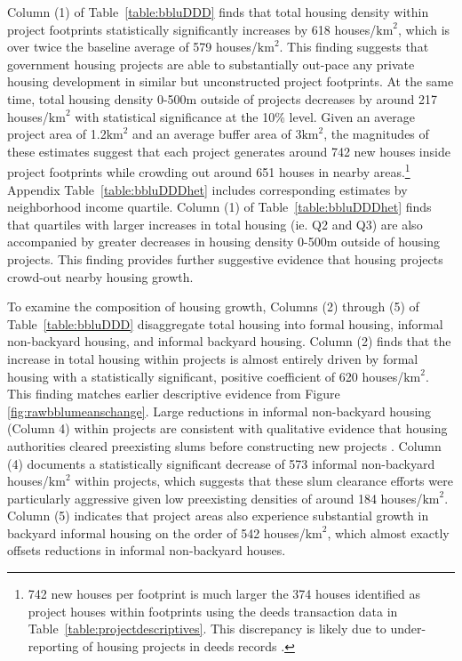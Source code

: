 \documentclass[12pt]{article}
\begin{document}
Column (1) of Table~\ref{table:bbluDDD} finds that total housing density within project footprints statistically significantly increases by 618 houses/$\text{km}^{2}$, which is over twice the baseline average of 579 houses/$\text{km}^{2}$.  This finding suggests that government housing projects are able to substantially out-pace any private housing development in similar but unconstructed project footprints.  At the same time, total housing density 0-500m outside of projects decreases by around 217 houses/$\text{km}^{2}$ with statistical significance at the 10\% level.  Given an average project area of 1.2$\text{km}^{2}$ and an average buffer area of 3$\text{km}^{2}$, the magnitudes of these estimates suggest that each project generates around 742 new houses inside project footprints while crowding out around 651 houses in nearby areas.\footnote{742 new houses per footprint is much larger the 374 houses identified as project houses within footprints using the deeds transaction data in Table~\ref{table:projectdescriptives}.  This discrepancy is likely due to under-reporting of housing projects in deeds records \citep{seriq}.}  Appendix Table~\ref{table:bbluDDDhet} includes corresponding estimates by neighborhood income quartile.  Column (1) of Table~\ref{table:bbluDDDhet} finds that quartiles with larger increases in total housing (ie. Q2 and Q3) are also accompanied by greater decreases in housing density 0-500m outside of housing projects.  This finding provides further suggestive evidence that housing projects crowd-out nearby housing growth.


To examine the composition of housing growth, Columns (2) through (5) of Table~\ref{table:bbluDDD} disaggregate total housing into formal housing, informal non-backyard housing, and informal backyard housing.  Column (2) finds that the increase in total housing within projects is almost entirely driven by formal housing with a statistically significant, positive coefficient of 620 houses/$\text{km}^{2}$.  This finding matches earlier descriptive evidence from Figure \ref{fig:rawbblumeanschange}.  Large reductions in informal non-backyard housing (Column 4) within projects are consistent with qualitative evidence that housing authorities cleared preexisting slums before constructing new projects \citep{hofmeyr2008risk}.  Column (4) documents a statistically significant decrease of 573 informal non-backyard houses/$\text{km}^{2}$ within projects, which suggests that these slum clearance efforts were particularly aggressive given low preexisting densities of around 184 houses/$\text{km}^{2}$.  Column (5) indicates that project areas also experience substantial growth in backyard informal housing on the order of 542 houses/$\text{km}^{2}$, which almost exactly offsets reductions in informal non-backyard houses.    
\end{document}
